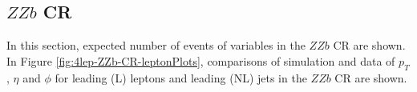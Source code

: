 \subsection{$ZZb$ CR}
\label{sec:controlplotstetralepton-ZZb-CR}


In this section, expected number of events of variables in the $ZZb$ CR are shown. In Figure \ref{fig:4lep-ZZb-CR-leptonPlots}, comparisons of simulation and data of $p_{T}$, $\eta$ and $\phi$ for leading (L) leptons and leading (NL) jets in the $ZZb$ CR are shown.
\begin{figure}[htbp]
\centering
  \begin{tabular}{ccc}



\end{tabular}
\end{figure}
